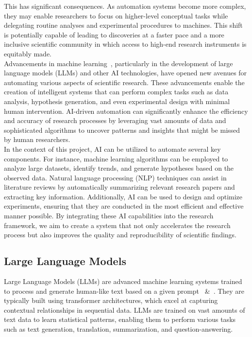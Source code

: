 This has significant consequences. As automation systems become more complex, they may enable researchers to focus on higher-level conceptual tasks while delegating routine analyses and experimental procedures to machines. This shift is potentially capable of leading to discoveries at a faster pace and a more inclusive scientific community in which access to high-end research instruments is equitably made.\\
Advancements in machine learning~\cite{Goodfellow2016DeepLearning}, particularly in the development of large language models (LLMs) and other AI technologies, have opened new avenues for automating various aspects of scientific research. These advancements enable the creation of intelligent systems that can perform complex tasks such as data analysis, hypothesis generation, and even experimental design with minimal human intervention. AI-driven automation can significantly enhance the efficiency and accuracy of research processes by leveraging vast amounts of data and sophisticated algorithms to uncover patterns and insights that might be missed by human researchers.\\
In the context of this project, AI can be utilized to automate several key components. For instance, machine learning algorithms can be employed to analyze large datasets, identify trends, and generate hypotheses based on the observed data. Natural language processing (NLP) techniques can assist in literature reviews by automatically summarizing relevant research papers and extracting key information. Additionally, AI can be used to design and optimize experiments, ensuring that they are conducted in the most efficient and effective manner possible. By integrating these AI capabilities into the research framework, we aim to create a system that not only accelerates the research process but also improves the quality and reproducibility of scientific findings.

\subsection{Large Language Models}
Large Language Models (LLMs) are advanced machine learning systems trained to process and generate human-like text based on a given prompt~\cite{2023arXiv231211805G} \&~\cite{2024arXiv240721783G}. They are typically built using transformer architectures, which excel at capturing contextual relationships in sequential data. LLMs are trained on vast amounts of text data to learn statistical patterns, enabling them to perform various tasks such as text generation, translation, summarization, and question-answering. 


